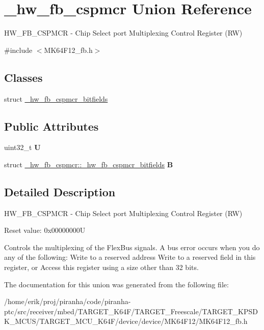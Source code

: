 \hypertarget{union__hw__fb__cspmcr}{}\section{\+\_\+hw\+\_\+fb\+\_\+cspmcr Union Reference}
\label{union__hw__fb__cspmcr}


H\+W\+\_\+\+F\+B\+\_\+\+C\+S\+P\+M\+CR -\/ Chip Select port Multiplexing Control Register (RW)  




{\ttfamily \#include $<$M\+K64\+F12\+\_\+fb.\+h$>$}

\subsection*{Classes}
\begin{DoxyCompactItemize}
\item 
struct \hyperlink{struct__hw__fb__cspmcr_1_1__hw__fb__cspmcr__bitfields}{\+\_\+hw\+\_\+fb\+\_\+cspmcr\+\_\+bitfields}
\end{DoxyCompactItemize}
\subsection*{Public Attributes}
\begin{DoxyCompactItemize}
\item 
uint32\+\_\+t {\bfseries U}\hypertarget{union__hw__fb__cspmcr_aa4e8e27ddb4bd8706773742318ba3797}{}\label{union__hw__fb__cspmcr_aa4e8e27ddb4bd8706773742318ba3797}

\item 
struct \hyperlink{struct__hw__fb__cspmcr_1_1__hw__fb__cspmcr__bitfields}{\+\_\+hw\+\_\+fb\+\_\+cspmcr\+::\+\_\+hw\+\_\+fb\+\_\+cspmcr\+\_\+bitfields} {\bfseries B}\hypertarget{union__hw__fb__cspmcr_ad715177d5912ecf2ef67c4cb70e024e3}{}\label{union__hw__fb__cspmcr_ad715177d5912ecf2ef67c4cb70e024e3}

\end{DoxyCompactItemize}


\subsection{Detailed Description}
H\+W\+\_\+\+F\+B\+\_\+\+C\+S\+P\+M\+CR -\/ Chip Select port Multiplexing Control Register (RW) 

Reset value\+: 0x00000000U

Controls the multiplexing of the Flex\+Bus signals. A bus error occurs when you do any of the following\+: Write to a reserved address Write to a reserved field in this register, or Access this register using a size other than 32 bits. 

The documentation for this union was generated from the following file\+:\begin{DoxyCompactItemize}
\item 
/home/erik/proj/piranha/code/piranha-\/ptc/src/receiver/mbed/\+T\+A\+R\+G\+E\+T\+\_\+\+K64\+F/\+T\+A\+R\+G\+E\+T\+\_\+\+Freescale/\+T\+A\+R\+G\+E\+T\+\_\+\+K\+P\+S\+D\+K\+\_\+\+M\+C\+U\+S/\+T\+A\+R\+G\+E\+T\+\_\+\+M\+C\+U\+\_\+\+K64\+F/device/device/\+M\+K64\+F12/M\+K64\+F12\+\_\+fb.\+h\end{DoxyCompactItemize}
